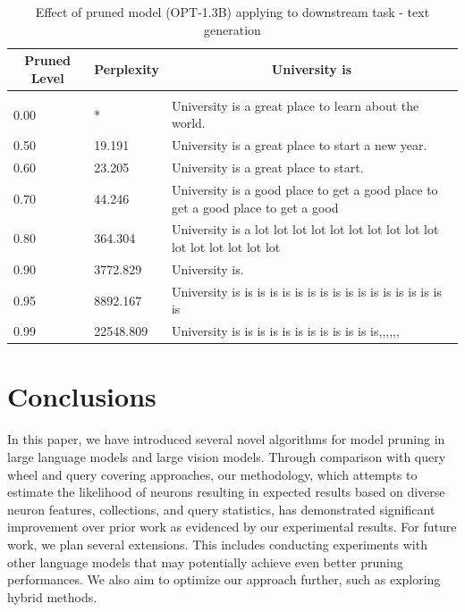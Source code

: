 \documentclass{article} %
\begin{document}
\begin{table}[t]
\caption{Effect of pruned model (OPT-1.3B) applying to downstream task - text generation}
\label{table-6}
\begin{center}
\begin{tabular}{lll}
\multicolumn{1}{c}{\bf Pruned Level}  &\multicolumn{1}{c}{\bf Perplexity} & \multicolumn{1}{c}{\bf University is} \\
\hline \\
0.00         & * & University is a great place to learn about the world. \\
0.50         & 19.191 & University is a great place to start a new year. \\
0.60         & 23.205 & University is a great place to start. \\
0.70         & 44.246 & University is a good place to get a good place to get a good place to get a good \\
0.80         & 364.304 & University is a lot lot lot lot lot lot lot lot lot lot lot lot lot lot lot lot \\
0.90         & 3772.829 & University is. \\
0.95         & 8892.167 & University is is is is is is is is is is is is is is is is is is \\
0.99         & 22548.809 & University is is is is is is is is is is is is,,,,,, \\
\end{tabular}
\end{center}
\end{table}

\section{Conclusions}
\label{conclue}

In this paper, we have introduced several novel algorithms for model pruning in large language models and large vision models. Through comparison with query wheel and query covering approaches, our methodology, which attempts to estimate the likelihood of neurons resulting in expected results based on diverse neuron features, collections, and query statistics, has demonstrated significant improvement over prior work as evidenced by our experimental results. For future work, we plan several extensions. This includes conducting experiments with other language models that may potentially achieve even better pruning performances. We also aim to optimize our approach further, such as exploring hybrid methods.
\end{document}
